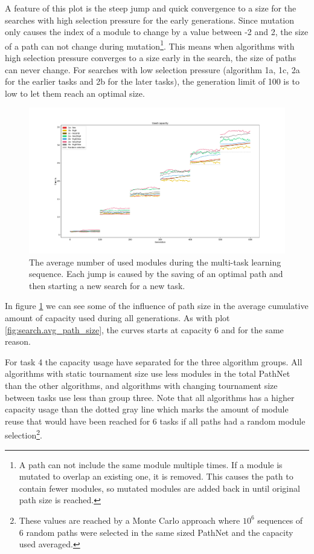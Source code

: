 A feature of this plot is the steep jump and quick convergence to a size for the searches with high selection pressure for the early generations. Since mutation only causes the index of a module to change by a value between -2 and 2, the size of a path can not change during mutation\footnote{A path can not include the same module multiple times. If a module is mutated to overlap an existing one, it is removed. This causes the path to contain fewer modules, so mutated modules are added back in until original path size is reached.}. This means when algorithms with high selection pressure converges to a size early in the search, the size of paths can never change. For searches with low selection pressure (algorithm 1a, 1c, 2a for the earlier tasks and 2b for the later tasks), the generation limit of 100 is to low to let them reach an optimal size. 

\begin{figure}[p!]%
    \includegraphics[width=1.2\textwidth,center]{Chapters/Experiments/search_algo/figures/Capacity_pr_generation.pdf}
    \caption{The average number of used modules during the multi-task learning sequence. Each jump is caused by the saving of an optimal path and then starting a new search for a new task. }
    \label{fig:search.capacity}
\end{figure}

In figure \ref{fig:search.capacity} we can see some of the influence of path size in the average cumulative amount of capacity used during all generations. As with plot \ref{fig:search.avg_path_size}, the curves starts at capacity 6 and for the same reason. 

For task 4 the capacity usage have separated for the three algorithm groups. All algorithms with static tournament size use less modules in the total PathNet than the other algorithms, and algorithms with changing tournament size between tasks use less than group three. Note that all algorithms has a higher capacity usage than the dotted gray line which marks the amount of module reuse that would have been reached for 6 tasks if all paths had a random module selection\footnote{These values are reached by a Monte Carlo approach where \(10^{6}\) sequences of 6 random paths were selected in the same sized PathNet and the capacity used averaged.}.

